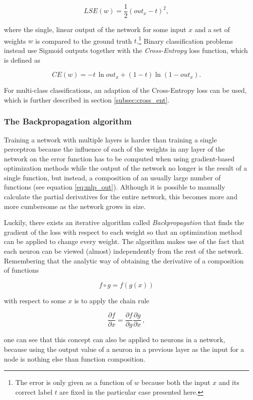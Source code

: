\[ LSE(w) = \frac{1}{2} \left ( out_x - t \right )^2, \]

\noindent where the single, linear output of the network for some input $x$ and a set of weights $w$ is compared to the ground truth $t$.\footnote{The error is only given as a function of $w$ because both the input $x$ and its correct label $t$ are fixed in the particular case presented here.} Binary classification problems instead use Sigmoid outputs together with the \textit{Cross-Entropy} loss function, which is defined as 

\[ CE(w) =  -t \, \ln out_x + (1 - t) \ln (1 - out_x). \]

\noindent For multi-class classifications, an adaption of the Cross-Entropy loss can be used, which is further described in section \ref{subsec:cross_ent}. \cite[pp. 232-236]{bishop_pattern}\\

	\subsubsection{The Backpropagation algorithm}
Training a network with multiple layers is harder than training a single perceptron because the influence of each of the weights in any layer of the network on the error function has to be computed when using gradient-based optimization methods while the output of the network no longer is the result of a single function, but instead, a composition of an usually large number of functions (see equation \ref{eq:mlp_out}). Although it is possible to manually calculate the partial derivatives for the entire network, this becomes more and more cumbersome as the network grows in size.

Luckily, there exists an iterative algorithm called \textit{Backpropagation} \cite{backprop} that finds the gradient of the loss with respect to each weight so that an optimization method can be applied to change every weight. The algorithm makes use of the fact that each neuron can be viewed (almost) independently from the rest of the network. Remembering that the analytic way of obtaining the derivative of a composition of functions 

\[ f \circ g = f(g(x)) \]

\noindent with respect to some $x$ is to apply the chain rule

\[ \frac{\partial f}{\partial x} =\frac{\partial f}{\partial g} \frac{\partial g}{\partial x} \, , \]

\noindent one can see that this concept can also be applied to neurons in a network, because using the output value of a neuron in a previous layer as the input for a node is nothing else than function composition.\\

